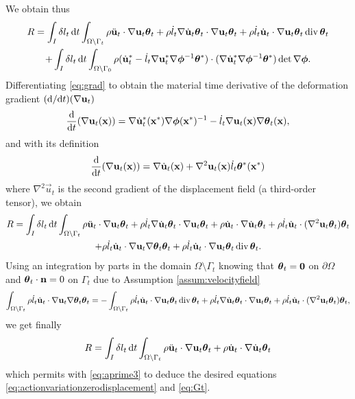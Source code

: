 We obtain thus
\begin{multline*}
R=\int_I\delta l_t\D{t}\int_\domaint\rho\ddot{\vec{u}}_t\cdot\nabla\vec{u}_t\vtheta_t+\rho\dot{l}_t\nabla\dot{\vec{u}}_t\vtheta_t\cdot\nabla\vec{u}_t\vtheta_t+\rho\dot{l}_t\dot{\vec{u}}_t\cdot\nabla\vec{u}_t\vtheta_t\div\vtheta_t  \\
+\int_I\delta l_t\D{t}\int_\domaini\rho(\dot{\vec{u}}^*_t-\dot{l}_t\nabla\vec{u}^*_t\nabla\philt^{-1}\vtheta^*)\cdot(\nabla\dot{\vec{u}}^*_t\nabla\philt^{-1}\vtheta^*)\det\nabla\philt.
\end{multline*}
Differentiating \eqref{eq:grad} to obtain the material time derivative of the deformation gradient $(\md/\md t)(\nabla\vec{u}_t)$
\[
\frac{\md}{\md t}(\nabla\vec{u}_t(\vec{x}))=\nabla\dot{\vec{u}}_t^*(\vec{x}^*)\nabla\philt(\vec{x}^*)^{-1}-\dot{l}_t\nabla\vec{u}_t(\vec{x})\nabla\vtheta_t(\vec{x}),
\]
and with its definition
\[
\frac{\md}{\md t}(\nabla\vec{u}_t(\vec{x}))=\nabla\dot{\vec{u}}_t(\vec{x})+\nabla^2\vec{u}_t(\vec{x})\dot{l}_t\vtheta^*(\vec{x}^*)
\]
where $\nabla^2\vec{u}_t$ is the second gradient of the displacement field (a third-order tensor), we obtain
\begin{multline*}
R=\int_I\delta l_t\D{t}\int_\domaint\rho\ddot{\vec{u}}_t\cdot\nabla\vec{u}_t\vtheta_t+\rho\dot{l}_t\nabla\dot{\vec{u}}_t\vtheta_t\cdot\nabla\vec{u}_t\vtheta_t+\rho\dot{\vec{u}}_t\cdot\nabla\dot{\vec{u}}_t\vtheta_t+\rho\dot{l}_t\dot{\vec{u}}_t\cdot(\nabla^2\vec{u}_t\vtheta_t)\vtheta_t  \\
+\rho\dot{l}_t\dot{\vec{u}}_t\cdot\nabla\vec{u}_t\nabla\vtheta_t\vtheta_t+\rho\dot{l}_t\dot{\vec{u}}_t\cdot\nabla\vec{u}_t\vtheta_t\div\vtheta_t.
\end{multline*}
Using an integration by parts in the domain $\Omega\setminus\Gamma_t$ knowing that $\vtheta_t=\vec{0}$ on $\partial\Omega$ and $\vtheta_t\cdot\vec{n}=0$ on $\Gamma_t$ due to Assumption \ref{assum:velocityfield}
\[
\int_\domaint\rho\dot{l}_t\dot{\vec{u}}_t\cdot\nabla\vec{u}_t\nabla\vtheta_t\vtheta_t=-\int_\domaint\rho\dot{l}_t\dot{\vec{u}}_t\cdot\nabla\vec{u}_t\vtheta_t\div\vtheta_t+\rho\dot{l}_t\nabla\dot{\vec{u}}_t\vtheta_t\cdot\nabla\vec{u}_t\vtheta_t+\rho\dot{l}_t\dot{\vec{u}}_t\cdot(\nabla^2\vec{u}_t\vtheta_t)\vtheta_t,
\]
we get finally
\[
R=\int_I\delta l_t\D{t}\int_\domaint\rho\ddot{\vec{u}}_t\cdot\nabla\vec{u}_t\vtheta_t+\rho\dot{\vec{u}}_t\cdot\nabla\dot{\vec{u}}_t\vtheta_t
\]
which permits with \eqref{eq:aprime3} to deduce the desired equations \eqref{eq:actionvariationzerodisplacement} and \eqref{eq:Gt}.

